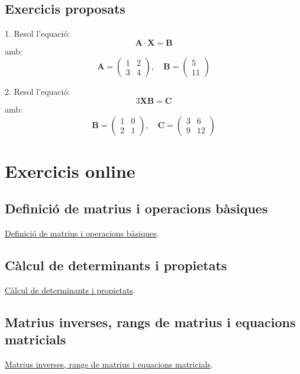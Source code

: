 \documentclass[12pt]{article}
\newcommand{\mat}[1]{\mathbf{#1}}
\begin{document}
\subsection*{Exercicis proposats}
\begin{exercici}
1. Resol l'equació:
\[
\mat{A} \cdot \mat{X} = \mat{B}
\]
amb:
\[
\mat{A} = \begin{pmatrix}
1 & 2 \\
3 & 4
\end{pmatrix}, \quad
\mat{B} = \begin{pmatrix}
5 \\
11
\end{pmatrix}
\]

2. Resol l’equació:
\[
3\mat{X}\mat{B} = \mat{C}
\]
amb:
\[
\mat{B} = \begin{pmatrix}
1 & 0 \\
2 & 1
\end{pmatrix}, \quad
\mat{C} = \begin{pmatrix}
3 & 6 \\
9 & 12
\end{pmatrix}
\]
\end{exercici}

\section{Exercicis online}
\begin{exercici}
    
\subsection*{Definició de matrius i operacions bàsiques}
\href{https://www.aldeaglobal.net/jrillo/MATES2BAT/matrius_exercicis_1.html}{Definició de matrius i operacions bàsiques}.

\subsection*{Càlcul de determinants i propietats}
\href{https://www.aldeaglobal.net/jrillo/MATES2BAT/matrius_exercicis_2.html}{Càlcul de determinants i propietats}.

\subsection*{Matrius inverses, rangs de matrius i equacions matricials}
\href{https://www.aldeaglobal.net/jrillo/MATES2BAT/matrius_exercicis_3.html}{Matrius inverses, rangs de matrius i equacions matricials}.

\end{exercici}
\end{document}
